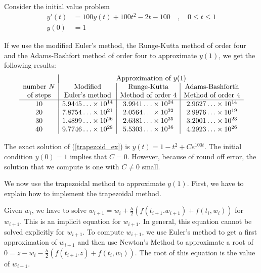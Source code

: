 \begin{egg}
Consider the initial value problem
\begin{equation}\label{trapezoid_ex}
\begin{split}
y'(t) &= 100 y(t) + 100 t^2  -2t -100 \quad , \quad 0\leq t \leq 1 \\
y(0) &= 1
\end{split}
\end{equation}

If we use the modified Euler's method, the Runge-Kutta method of
order four and the Adams-Bashfort method of order four to approximate
$y(1)$, we get the following results:
\[
\begin{array}{c|c|c|c}
 & \multicolumn{3}{|c}{\text{Approximation of $y(1)$}} \\
\text{number $N$} & \text{Modified} & \text{Runge-Kutta} &
\text{Adams-Bashforth} \\
\text{of steps} & \text{Euler's method} & \text{Method of order $4$} &
\text{Method of order $4$}\\
\hline
10 & 5.9445\ldots \times 10^{14} & 3.9941\ldots \times 10^{24} &
2.9627\ldots \times 10^{14} \\
20 & 7.8754\ldots \times 10^{21} & 2.0564\ldots \times 10^{32} &
2.9976\ldots \times 10^{19} \\
30 & 1.4899\ldots \times 10^{26} & 2.6381\ldots \times 10^{35} &
3.2001\ldots \times 10^{23} \\
40 & 9.7746\ldots \times 10^{28} & 5.5303\ldots \times 10^{36} &
4.2923\ldots \times 10^{26}
\end{array}
\]

The exact solution of (\ref{trapezoid_ex}) is
$y(t) = 1-t^2+C e^{100t}$.  The initial condition $y(0)=1$ implies
that $C=0$.  However, because of round off error, the solution that we
compute is one with $C\not=0$ small.

We now use the trapezoidal method to approximate $y(1)$.  First, we
have to explain how to implement the trapezoidal method.

Given $w_i$, we have to solve
$\displaystyle w_{i+1} =
w_i + \frac{h}{2} \left( f(t_{i+1}.w_{i+1}) + f(t_i,w_i) \right)$
for $w_{i+1}$.  This is an implicit equation for $w_{i+1}$.  In
general, this equation cannot be solved explicitly for $w_{i+1}$.
To compute $w_{i+1}$, we use Euler's method to get a first approximation
of $w_{i+1}$ and then use Newton's Method to approximate a root
of
$\displaystyle
 0 = z - w_i - \frac{h}{2} \left( f(t_{i+1}.z) + f(t_i,w_i) \right)$.
The root of this equation is the value of $w_{i+1}$.


\end{egg}
